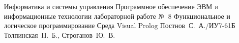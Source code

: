 \makereporttitle
	{Информатика и системы управления} %
	{Программное обеспечение ЭВМ и информационные технологии} %
	{лабораторной работе №~8} %
	{Функциональное и логическое программирование} %
	{Среда Visual Prolog} %
	{} %
	{Постнов~С.~А./ИУ7-61Б} %
	{Толпинская~Н.~Б., Строганов~Ю.~В.} %